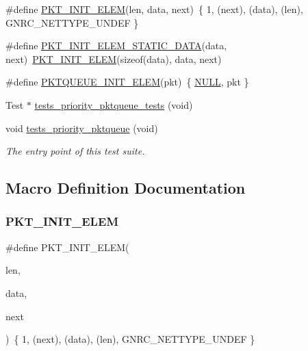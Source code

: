\begin{DoxyCompactItemize}
\item 
\#define \hyperlink{tests-priority__pktqueue_8c_ab2531718e1cc1f5064a029bd37d68769}{P\+K\+T\+\_\+\+I\+N\+I\+T\+\_\+\+E\+L\+EM}(len,  data,  next)~\{ 1, (next), (data), (len), G\+N\+R\+C\+\_\+\+N\+E\+T\+T\+Y\+P\+E\+\_\+\+U\+N\+D\+EF \}
\item 
\#define \hyperlink{tests-priority__pktqueue_8c_af71505efb36e3b7990db43cf967770a6}{P\+K\+T\+\_\+\+I\+N\+I\+T\+\_\+\+E\+L\+E\+M\+\_\+\+S\+T\+A\+T\+I\+C\+\_\+\+D\+A\+TA}(data,  next)~\hyperlink{tests-priority__pktqueue_8c_ab2531718e1cc1f5064a029bd37d68769}{P\+K\+T\+\_\+\+I\+N\+I\+T\+\_\+\+E\+L\+EM}(sizeof(data), data, next)
\item 
\#define \hyperlink{tests-priority__pktqueue_8c_acaa6b7d25eef99dee1c43fb8e3079312}{P\+K\+T\+Q\+U\+E\+U\+E\+\_\+\+I\+N\+I\+T\+\_\+\+E\+L\+EM}(pkt)~\{ \hyperlink{openmote-cc2538_2lwip_2src_2include_2lwip_2def_8h_a070d2ce7b6bb7e5c05602aa8c308d0c4}{N\+U\+LL}, pkt \}
\item 
Test $\ast$ \hyperlink{tests-priority__pktqueue_8c_a02585a4dfc8e06f88b1c4d77aa1d4784}{tests\+\_\+priority\+\_\+pktqueue\+\_\+tests} (void)
\item 
void \hyperlink{group__unittests_gab6133c9a0e70affe6b5a5267478e6d9d}{tests\+\_\+priority\+\_\+pktqueue} (void)
\begin{DoxyCompactList}\small\item\em The entry point of this test suite. \end{DoxyCompactList}\end{DoxyCompactItemize}


\subsection{Macro Definition Documentation}
\mbox{\label{tests-priority__pktqueue_8c_ab2531718e1cc1f5064a029bd37d68769}} 
\subsubsection{\texorpdfstring{P\+K\+T\+\_\+\+I\+N\+I\+T\+\_\+\+E\+L\+EM}{PKT\_INIT\_ELEM}}
{\footnotesize\ttfamily \#define P\+K\+T\+\_\+\+I\+N\+I\+T\+\_\+\+E\+L\+EM(\begin{DoxyParamCaption}\item[{}]{len,  }\item[{}]{data,  }\item[{}]{next }\end{DoxyParamCaption})~\{ 1, (next), (data), (len), G\+N\+R\+C\+\_\+\+N\+E\+T\+T\+Y\+P\+E\+\_\+\+U\+N\+D\+EF \}}

